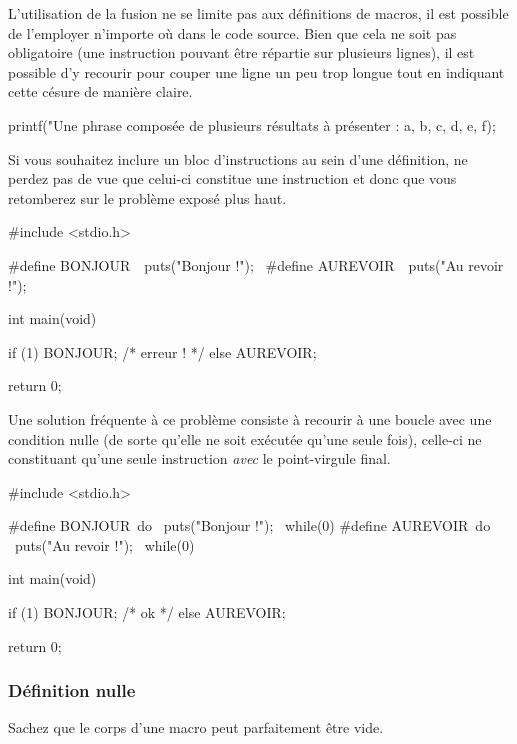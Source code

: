 \begin{infobox}
  L'utilisation de la fusion ne se
limite pas aux définitions de macros, il est possible de l'employer
n'importe où dans le code source. Bien que cela ne soit pas obligatoire
(une instruction pouvant être répartie sur plusieurs lignes), il est
possible d'y recourir pour couper une ligne un peu trop longue tout en
indiquant cette césure de manière claire. 
\begin{C}
 printf("Une phrase composée de plusieurs résultats à présenter : %
a, b, c, d, e, f);
\end{C}
\end{infobox}

Si vous souhaitez inclure un bloc d'instructions au sein d'une
définition, ne perdez pas de vue que celui-ci constitue une instruction
et donc que vous retomberez sur le problème exposé plus haut.

\begin{C}
#include <stdio.h>

#define BONJOUR\
    {\
        puts("Bonjour !");\
    }
#define AUREVOIR\
    {\
        puts("Au revoir !");\
    }

int main(void)
{
    if (1)
        BONJOUR; /* erreur ! */
    else
        AUREVOIR;

    return 0;
}
\end{C}

Une solution fréquente à ce problème consiste à recourir à une boucle
 avec une condition nulle (de sorte qu'elle ne
soit exécutée qu'une seule fois), celle-ci ne constituant qu'une seule
instruction \emph{avec} le point-virgule final.

\begin{C}
#include <stdio.h>

#define BONJOUR\
    do {\
        puts("Bonjour !");\
    } while(0)
#define AUREVOIR\
    do {\
        puts("Au revoir !");\
    } while(0)

int main(void)
{
    if (1)
        BONJOUR; /* ok */
    else
        AUREVOIR;

    return 0;
}
\end{C}

\subsubsection{Définition nulle}
\label{definition-nulle}

Sachez que le corps d'une macro peut parfaitement être vide.

